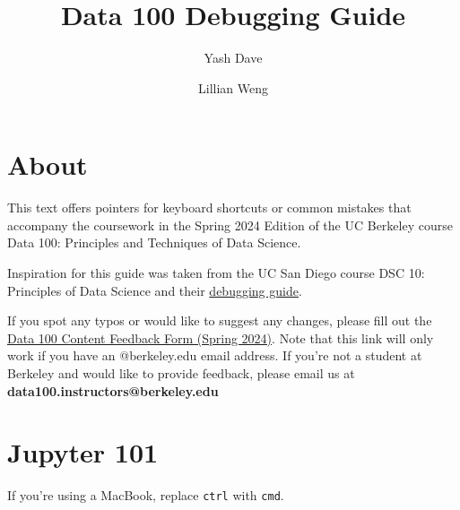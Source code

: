 \documentclass[
  letterpaper,
  DIV=11,
  numbers=noendperiod]{scrreprt}
\title{Data 100 Debugging Guide}
\author{Yash Dave \and Lillian Weng}
\date{}
\renewcommand*\contentsname{Table of contents}
\newcommand\contentsname{Table of contents}
\begin{document}
\maketitle

\renewcommand*\contentsname{Table of contents}
{
\hypersetup{linkcolor=}
\setcounter{tocdepth}{2}
\tableofcontents
}

\chapter*{About}\label{about}


This text offers pointers for keyboard shortcuts or common mistakes that
accompany the coursework in the Spring 2024 Edition of the UC Berkeley
course Data 100: Principles and Techniques of Data Science.

Inspiration for this guide was taken from the UC San Diego course DSC
10: Principles of Data Science and their
\href{https://dsc10.com/debugging/}{debugging guide}.

If you spot any typos or would like to suggest any changes, please fill
out the
\href{https://docs.google.com/forms/d/e/1FAIpQLSe0fBEJwt6aEfZxU3fh3llNk8rSWHj6Umq0km3wPqmFu0MlGA/viewform?usp=sf_link}{Data
100 Content Feedback Form (Spring 2024)}. Note that this link will only
work if you have an @berkeley.edu email address. If you're not a student
at Berkeley and would like to provide feedback, please email us at
\textbf{data100.instructors@berkeley.edu}


\chapter{Jupyter 101}\label{jupyter-101}

\begin{tcolorbox}[enhanced jigsaw, colback=white, left=2mm, bottomrule=.15mm, toptitle=1mm, opacitybacktitle=0.6, bottomtitle=1mm, breakable, arc=.35mm, toprule=.15mm, opacityback=0, coltitle=black, title=\textcolor{quarto-callout-note-color}{\faInfo}\hspace{0.5em}{Note}, colframe=quarto-callout-note-color-frame, titlerule=0mm, rightrule=.15mm, colbacktitle=quarto-callout-note-color!10!white, leftrule=.75mm]

If you're using a MacBook, replace \texttt{ctrl} with \texttt{cmd}.

\end{tcolorbox}
\end{document}
